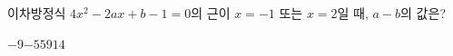 이차방정식 $4x^2-2ax+b-1=0$의 근이 $x=-1$ 또는 $x=2$일 때, $a-b$의 값은? 
\begin{choices32}{$-9$}{$-5$}{$5$}{$9$}{$14$}\end{choices32}
